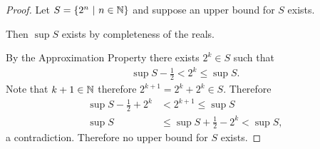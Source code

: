 \documentclass[12pt]{article}
\begin{document}
\begin{proof}
  Let $S = \{2^n ~|~ n \in \mathbb{N}\}$ and suppose an upper bound for $S$ exists.

  Then $\sup S$ exists by completeness of the reals.

  By the Approximation Property there exists $2^k \in S$ such that
  \begin{align*}
    \sup S - \frac{1}{2} < 2^k \leq \sup S.
  \end{align*}
  Note that $k+1 \in \mathbb{N}$ therefore $2^{k+1} = 2^k + 2^k \in S$. Therefore
  \begin{align*}
    \sup S - \frac{1}{2} + 2^k &< 2^{k+1} \leq \sup S\\
    \sup S &\leq \sup S + \frac{1}{2} - 2^k < \sup S,
  \end{align*}
  a contradiction. Therefore no upper bound for $S$ exists.
\end{proof}

\newpage
\end{document}
